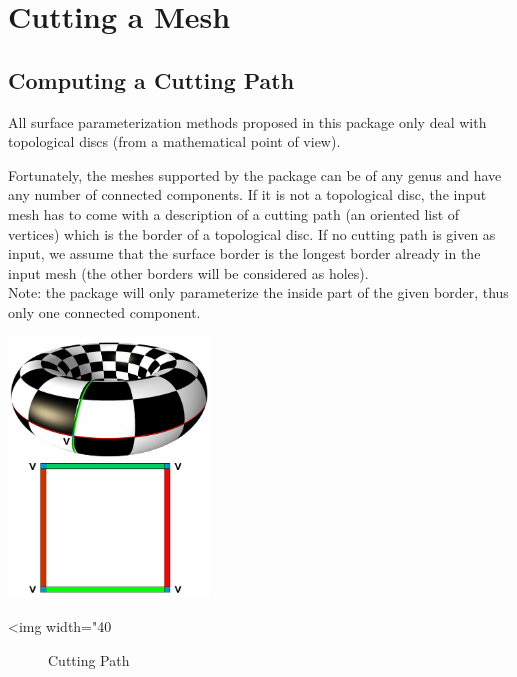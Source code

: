 \section{Cutting a Mesh}
\label{sec:Cutting-a-Mesh}

\subsection{Computing a Cutting Path}

All surface parameterization methods proposed in this package only
deal with topological discs (from a mathematical point of view).

Fortunately, the meshes supported by the package can be of any genus and
have any number of connected components. If it is not a topological
disc, the input mesh has to come with a description of a cutting path (an oriented list of
vertices) which is the border of a topological disc.  If no cutting path is
given as input, we assume that the surface border is the longest border already
in the input mesh (the other borders will be considered as holes). \\
Note: the package will only parameterize the inside part of the given border,
thus only one connected component.


\begin{center}
    \label{Surface_mesh_parameterization-fig-cut}
    \begin{ccTexOnly}
        \includegraphics[width=0.4\textwidth]{Surface_mesh_parameterization/cut} %
    \end{ccTexOnly}
    \begin{ccHtmlOnly}
        <img width="40%
    \end{ccHtmlOnly}
    \begin{figure}[h]
        \caption{Cutting Path}
    \end{figure}
\end{center}

